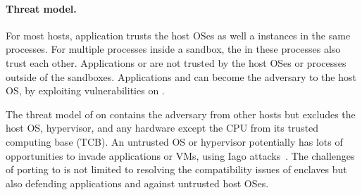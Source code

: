 \paragraph{Threat model.}
For most hosts, application trusts the host OSes as well a \libos{} instances in the same processes.
For multiple processes inside a sandbox,
the \liboses{} in these processes
also trust each other.
Applications or \liboses{} are not trusted by the host OSes or processes outside of the sandboxes.
Applications and \liboses{}
can become the adversary to the host OS,
by exploiting vulnerabilities on \thehostabi{}.




The threat model of \graphene{} on \sgx{}
contains the adversary from other hosts but excludes
the host OS, hypervisor, and any hardware except the CPU from its trusted computing base (TCB).
An untrusted OS or hypervisor
potentially has lots of opportunities to invade applications or VMs,
using Iago attacks~\cite{checkoway13iago}.
The challenges of porting \graphene{} to \sgx{} is not limited to resolving the compatibility issues of enclaves but also defending applications and \liboses{} against untrusted host OSes.







